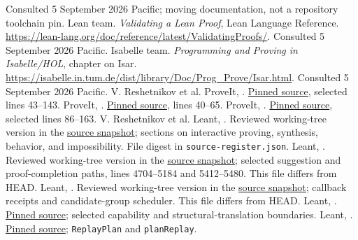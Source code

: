 \documentclass[11pt,letterpaper]{article}
\newcommand{\code}[1]{\nolinkurl{#1}}
\newcommand{\source}[2]{\href{#1}{#2}}
\begin{document}
\begin{thebibliography}{99}
Consulted 5 September 2026 Pacific; moving documentation, not a repository toolchain pin.
 Lean team. \emph{Validating a Lean Proof}, Lean Language
Reference. \url{https://lean-lang.org/doc/reference/latest/ValidatingProofs/}.
Consulted 5 September 2026 Pacific.
 Isabelle team. \emph{Programming and Proving in Isabelle/HOL},
chapter on Isar. \url{https://isabelle.in.tum.de/dist/library/Doc/Prog_Prove/Isar.html}.
Consulted 5 September 2026 Pacific.
 V. Reshetnikov et al. ProveIt,
.
\source{https://github.com/VladimirReshetnikov/ProveIt/blob/7c4e3f109405b9805b35d27ae96bf09c7ee5f3d5/Analysis/FabiusFunction/Lean/FabiusFunction/BinomialInversion.lean}{Pinned source}, selected lines 43--143.
 ProveIt,
.
\source{https://github.com/VladimirReshetnikov/ProveIt/blob/7c4e3f109405b9805b35d27ae96bf09c7ee5f3d5/Analysis/FabiusFunction/Lean/FabiusFunction/AutonomousIteratedDeriv.lean}{Pinned source}, lines 40--65.
 ProveIt,
.
\source{https://github.com/VladimirReshetnikov/ProveIt/blob/7c4e3f109405b9805b35d27ae96bf09c7ee5f3d5/NumberTheory/IntegerSums/Lean/IntegerSums/FloorSqrtSum.lean}{Pinned source}, selected lines 86--163.
 V. Reshetnikov et al. Leant, .
Reviewed working-tree version in the \source{evidence/leant-reviewed-source.zip}{source snapshot}; sections on interactive proving, synthesis, behavior, and impossibility. File digest in \code{source-register.json}.
 Leant, .
Reviewed working-tree version in the \source{evidence/leant-reviewed-source.zip}{source snapshot}; selected suggestion and proof-completion paths, lines 4704--5184 and 5412--5480. This file differs from HEAD.
 Leant, .
Reviewed working-tree version in the \source{evidence/leant-reviewed-source.zip}{source snapshot}; callback receipts and candidate-group scheduler. This file differs from HEAD.
 Leant, .
\source{https://github.com/VladimirReshetnikov/Leant/blob/3a40904be8a410d832d9ab6900b3d3e7b425eccb/src/Leant/Synth/Fragment.hs}{Pinned source}; selected capability and structural-translation boundaries.
 Leant, .
\source{https://github.com/VladimirReshetnikov/Leant/blob/3a40904be8a410d832d9ab6900b3d3e7b425eccb/src/Leant/Synth/Replay.hs}{Pinned source}; \code{ReplayPlan} and \code{planReplay}.

\end{thebibliography}
\end{document}
